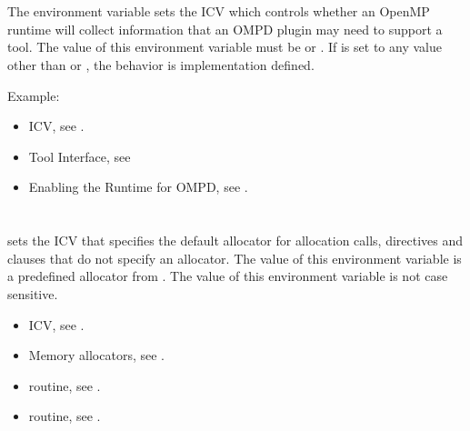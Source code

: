 \section{}
\label{sec:OMP_DEBUG}

The  environment variable sets the
 ICV which controls whether an OpenMP runtime
will collect information that an OMPD plugin may need to support
a tool.
The value of this environment variable must be 
or .
If  is set to any value other than 
or , the behavior is implementation defined.

Example:
\begin{ompEnv}
\end{ompEnv}

\crossreferences
\begin{itemize}
\item {} ICV,
see .
\item Tool Interface, see 
\item Enabling the Runtime for OMPD, see .
\end{itemize}


\section{}
\label{sec:OMP_ALLOCATOR}

 sets the  ICV that specifies the default
allocator for allocation calls, directives and clauses that do not specify an allocator.
The value of this environment variable is a predefined allocator from . The value of this environment variable is not case sensitive.

\crossreferences
\begin{itemize}
\item {} ICV, see .

\item Memory allocators, see .

\item {} routine, see .

\item {} routine, see .
\end{itemize}



